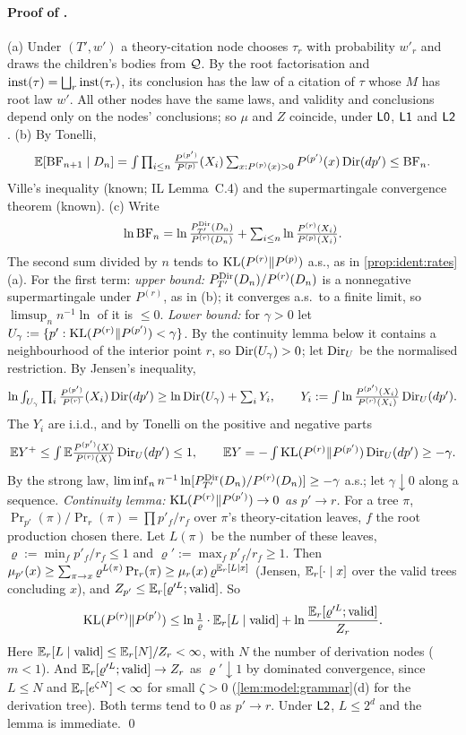 \paragraph{Proof of .}
(a) Under $(T',w')$ a theory-citation node chooses $\tau_r$ with probability $w'_r$ and draws the children's bodies from $\mathcal{Q}$. By the root factorisation and $\mathrm{inst}(\tau)=\bigsqcup_r\mathrm{inst}(\tau_r)$, its conclusion has the law of a citation of $\tau$ whose $M$ has root law $w'$. All other nodes have the same laws, and validity and conclusions depend only on the nodes' conclusions; so $\mu$ and $Z$ coincide, under $\mathord{\mathsf{L0}}$, $\mathord{\mathsf{L1}}$ and $\mathord{\mathsf{L2}}$.
(b) By Tonelli,
\[\textstyle\mathbb{E}[\mathrm{BF}_{n+1}\mid D_n]=\int\prod_{i\le n}\frac{P^{(p')}}{P^{(p)}}(X_i)\sum_{x:P^{(p)}(x)>0}P^{(p')}(x)\,\mathrm{Dir}(dp')\le\mathrm{BF}_n.\] Ville's inequality (known; IL Lemma~C.4) and the supermartingale convergence theorem (known).
(c) Write
\[\textstyle\ln\mathrm{BF}_n=\ln\frac{P^{\mathrm{Dir}}_{T'}(D_n)}{P^{(r)}(D_n)}+\sum_{i\le n}\ln\frac{P^{(r)}(X_i)}{P^{(p)}(X_i)}.\]
The second sum divided by $n$ tends to $\mathrm{KL}(P^{(r)}\|P^{(p)})$ a.s., as in \cref{prop:ident:rates}(a). For the first term:
\emph{upper bound:} $P^{\mathrm{Dir}}_{T'}(D_n)/P^{(r)}(D_n)$ is a nonnegative supermartingale under $P^{(r)}$, as in (b); it converges a.s.\ to a finite limit, so $\limsup_nn^{-1}\ln$ of it is $\le0$.
\emph{Lower bound:} for $\gamma>0$ let $U_\gamma:=\{p':\mathrm{KL}(P^{(r)}\|P^{(p')})<\gamma\}$. By the continuity lemma below it contains a neighbourhood of the interior point $r$, so $\mathrm{Dir}(U_\gamma)>0$; let $\mathrm{Dir}_U$ be the normalised restriction. By Jensen's inequality,
\[\textstyle\ln\int_{U_\gamma}\prod_i\frac{P^{(p')}}{P^{(r)}}(X_i)\,\mathrm{Dir}(dp')\ge\ln\mathrm{Dir}(U_\gamma)+\sum_iY_i,\qquad Y_i:=\int\ln\frac{P^{(p')}(X_i)}{P^{(r)}(X_i)}\,\mathrm{Dir}_U(dp').\]
The $Y_i$ are i.i.d., and by Tonelli on the positive and negative parts
\[\textstyle\mathbb{E} Y^+\le\int\mathbb{E}\frac{P^{(p')}(X)}{P^{(r)}(X)}\,\mathrm{Dir}_U(dp')\le1,\qquad\mathbb{E} Y=-\int\mathrm{KL}(P^{(r)}\|P^{(p')})\,\mathrm{Dir}_U(dp')\ge-\gamma.\] By the strong law, $\liminf_nn^{-1}\ln[P^{\mathrm{Dir}}_{T'}(D_n)/P^{(r)}(D_n)]\ge-\gamma$ a.s.; let $\gamma\downarrow0$ along a sequence.
\emph{Continuity lemma: $\mathrm{KL}(P^{(r)}\|P^{(p')})\to0$ as $p'\to r$.} For a tree $\pi$, $\Pr_{p'}(\pi)/\Pr_r(\pi)=\prod p'_f/r_f$ over $\pi$'s theory-citation leaves, $f$ the root production chosen there. Let $L(\pi)$ be the number of these leaves, $\varrho:=\min_fp'_f/r_f\le1$ and $\varrho':=\max_fp'_f/r_f\ge1$. Then $\mu_{p'}(x)\ge\sum_{\pi\to x}\varrho^{L(\pi)}\Pr_r(\pi)\ge\mu_r(x)\,\varrho^{\mathbb{E}_r[L\mid x]}$ (Jensen, $\mathbb{E}_r[\cdot\mid x]$ over the valid trees concluding $x$), and $Z_{p'}\le\mathbb{E}_r[\varrho'^L;\text{valid}]$. So
\[\mathrm{KL}(P^{(r)}\|P^{(p')})\le\ln\tfrac1\varrho\cdot\mathbb{E}_r[L\mid\text{valid}]+\ln\frac{\mathbb{E}_r[\varrho'^L;\text{valid}]}{Z_r}.\]
Here $\mathbb{E}_r[L\mid\text{valid}]\le\mathbb{E}_r[N]/Z_r<\infty$, with $N$ the number of derivation nodes ($m<1$). And $\mathbb{E}_r[\varrho'^L;\text{valid}]\to Z_r$ as $\varrho'\downarrow1$ by dominated convergence, since $L\le N$ and $\mathbb{E}_r[e^{\zeta N}]<\infty$ for small $\zeta>0$ (\cref{lem:model:grammar}(d) for the derivation tree). Both terms tend to $0$ as $p'\to r$. Under $\mathord{\mathsf{L2}}$, $L\le2^d$ and the lemma is immediate. \qed

